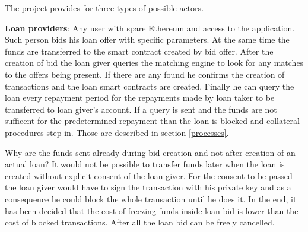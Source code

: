 \documentclass[a4paper,12pt,twoside,openany]{report}
\begin{document}
The project provides for three types of possible actors. 

\textbf{Loan providers}: Any user with spare Ethereum and access to the application. Such person bids his loan offer with specific parameters. At the same time the funds are transferred to the smart contract created by bid offer. After the creation of bid the loan giver queries the matching engine to look for any matches to the offers being present. If there are any found he confirms the creation of transactions and the loan smart contracts are created. Finally he can query the loan every repayment period for the repayments made by loan taker to be transferred to loan giver's account. If a query is sent and the funds are not sufficent for the predetermined repayment than the loan is blocked and collateral procedures step in. Those are described in section \ref{processes}.

Why are the funds sent already during bid creation and not after creation of an actual loan? It would not be possible to transfer funds later when the loan is created without explicit consent of the loan giver. For the consent to be passed the loan giver would have to sign the transaction with his private key and as a consequence he could block the whole transaction until he does it. In the end, it has been decided that the cost of freezing funds inside loan bid is lower than the cost of blocked transactions. After all the loan bid can be freely cancelled.
\end{document}
